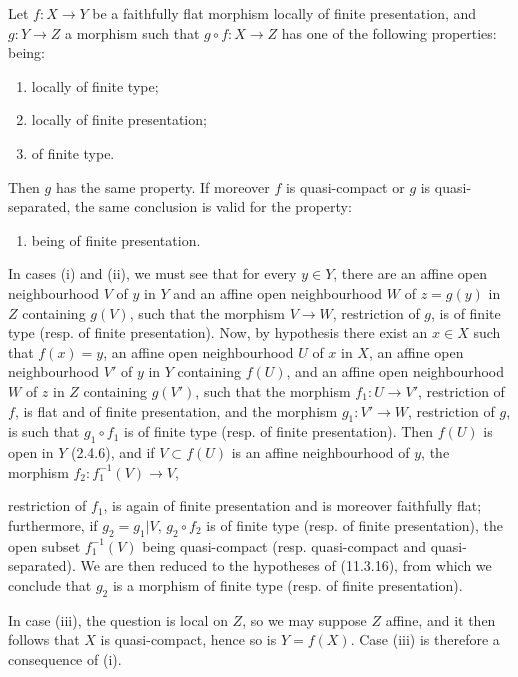 \begin{lemma}[17.7.5]
\label{IV.17.7.5}
Let $f:X\to Y$ be a faithfully flat morphism locally of finite presentation, and $g:Y\to Z$ a morphism such that $g\circ f:X\to Z$ has one of the following properties: being:
\begin{enumerate}
  \item[(i)] locally of finite type;
  \item[(ii)] locally of finite presentation;
  \item[(iii)] of finite type.
\end{enumerate}
Then $g$ has the same property. If moreover $f$ is quasi-compact or $g$ is quasi-separated, the same conclusion is valid for the property:
\begin{enumerate}
  \item[(iv)] being of finite presentation.
\end{enumerate}
\end{lemma}

In cases (i) and (ii), we must see that for every $y\in Y$, there are an affine open neighbourhood $V$ of $y$ in $Y$ and an affine open neighbourhood $W$ of $z=g(y)$ in $Z$ containing $g(V)$, such that the morphism $V\to W$, restriction of $g$, is of finite type (resp. of finite presentation). Now, by hypothesis there exist an $x\in X$ such that $f(x)=y$, an affine open neighbourhood $U$ of $x$ in $X$, an affine open neighbourhood $V'$ of $y$ in $Y$ containing $f(U)$, and an affine open neighbourhood $W$ of $z$ in $Z$ containing $g(V')$, such that the morphism $f_1:U\to V'$, restriction of $f$, is flat and of finite presentation, and the morphism $g_1:V'\to W$, restriction of $g$, is such that $g_1\circ f_1$ is of finite type (resp. of finite presentation). Then $f(U)$ is open in $Y$ (2.4.6), and if $V\subset f(U)$ is an affine neighbourhood of $y$, the morphism $f_2:f_1^{-1}(V)\to V$,


restriction of $f_1$, is again of finite presentation and is moreover faithfully flat; furthermore, if $g_2=g_1|V$, $g_2\circ f_2$ is of finite type (resp. of finite presentation), the open subset $f_1^{-1}(V)$ being quasi-compact (resp. quasi-compact and quasi-separated). We are then reduced to the hypotheses of (11.3.16), from which we conclude that $g_2$ is a morphism of finite type (resp. of finite presentation).

In case (iii), the question is local on $Z$, so we may suppose $Z$ affine, and it then follows that $X$ is quasi-compact, hence so is $Y=f(X)$. Case (iii) is therefore a consequence of (i).

